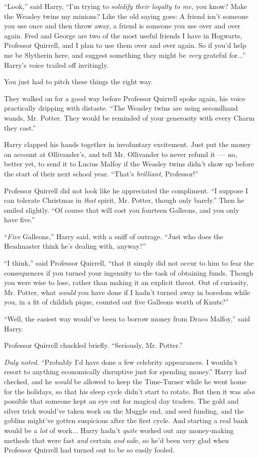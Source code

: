 ``Look,'' said Harry, ``I'm trying to \emph{solidify their loyalty to me,} you know? Make the Weasley twins my minions? Like the old saying goes: A friend isn't someone you use once and then throw away, a friend is someone you use over and over again. Fred and George are two of the most useful friends I have in Hogwarts, Professor Quirrell, and I plan to use them over and over again. So if you'd help me be Slytherin here, and suggest something they might be \emph{very} grateful for...'' Harry's voice trailed off invitingly.

You just had to pitch these things the right way.

They walked on for a good way before Professor Quirrell spoke again, his voice practically dripping with distaste. ``The Weasley twins are using secondhand wands, Mr. Potter. They would be reminded of your generosity with every Charm they cast.''

Harry clapped his hands together in involuntary excitement. Just put the money on account at Ollivander's, and tell Mr. Ollivander to never refund it~--- no, better yet, to send it to Lucius Malfoy if the Weasley twins didn't show up before the start of their next school year. ``That's \emph{brilliant}, Professor!''

Professor Quirrell did not look like he appreciated the compliment. ``I suppose I can tolerate Christmas in \emph{that} spirit, Mr. Potter, though only barely.'' Then he smiled slightly. ``Of course that will cost you fourteen Galleons, and you only have five.''

``\emph{Five} Galleons,'' Harry said, with a sniff of outrage. ``Just who does the Headmaster think he's dealing with, anyway?''

``I think,'' said Professor Quirrell, ``that it simply did not occur to him to fear the consequences if you turned your ingenuity to the task of obtaining funds. Though you were wise to lose, rather than making it an explicit threat. Out of curiosity, Mr. Potter, what \emph{would} you have done if I hadn't turned away in boredom while you, in a fit of childish pique, counted out five Galleons worth of Knuts?''

``Well, the easiest way would've been to borrow money from Draco Malfoy,'' said Harry.

Professor Quirrell chuckled briefly. ``Seriously, Mr. Potter.''

\emph{Duly noted.} ``Probably I'd have done a few celebrity appearances. I wouldn't resort to anything economically disruptive just for spending money.'' Harry had checked, and he \emph{would} be allowed to keep the Time-Turner while he went home for the holidays, so that his sleep cycle didn't start to rotate. But then it was \emph{also} possible that someone kept an eye out for magical day traders. The gold and silver trick would've taken work on the Muggle end, and seed funding, and the goblins might've gotten suspicious after the first cycle. And starting a real bank would be a \emph{lot} of work... Harry hadn't \emph{quite} worked out any money-making methods that were fast \emph{and} certain \emph{and} safe, so he'd been very glad when Professor Quirrell had turned out to be so easily fooled.

